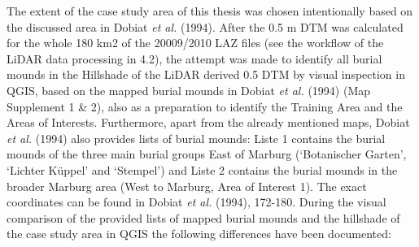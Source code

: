 \documentclass[
  12pt,
]{article}
\begin{document}
The extent of the case study area of this thesis was chosen intentionally based on the discussed area in Dobiat \emph{et al.} (1994). After the 0.5 m DTM was calculated for the whole 180 km2 of the 20009/2010 LAZ files (see the workflow of the LiDAR data processing in 4.2), the attempt was made to identify all burial mounds in the Hillshade of the LiDAR derived 0.5 DTM by visual inspection in QGIS, based on the mapped burial mounds in Dobiat \emph{et al.} (1994) (Map Supplement 1 \& 2), also as a preparation to identify the Training Area and the Areas of Interests. Furthermore, apart from the already mentioned maps, Dobiat \emph{et al.} (1994) also provides lists of burial mounds: Liste 1 contains the burial mounds of the three main burial groups East of Marburg (`Botanischer Garten', `Lichter Küppel' and `Stempel') and Liste 2 contains the burial mounds in the broader Marburg area (West to Marburg, Area of Interest 1). The exact coordinates can be found in Dobiat \emph{et al.} (1994), 172-180.
During the visual comparison of the provided lists of mapped burial mounds and the hillshade of the case study area in QGIS the following differences have been documented:
\end{document}
